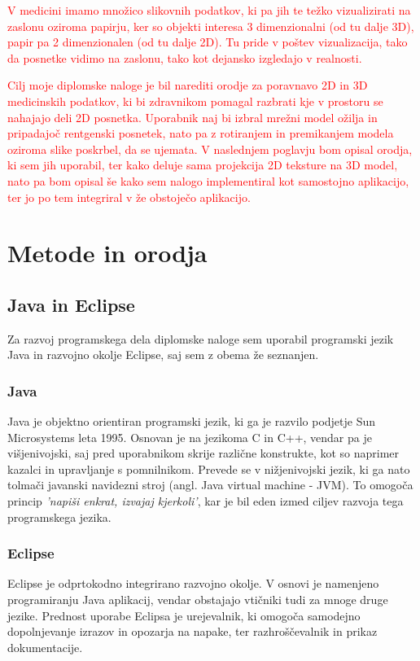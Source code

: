\documentclass[a4paper, 12pt]{book}
\begin{document}
\textcolor{red}{V medicini imamo množico slikovnih podatkov, ki pa jih te težko vizualizirati na zaslonu oziroma papirju, ker so objekti interesa 3 dimenzionalni (od tu dalje 3D), papir pa 2 dimenzionalen (od tu dalje 2D). Tu pride v poštev vizualizacija, tako da posnetke vidimo na zaslonu, tako kot dejansko izgledajo v realnosti.}

\textcolor{red}{Cilj moje diplomske naloge je bil narediti orodje za poravnavo 2D in 3D medicinskih podatkov, ki bi zdravnikom pomagal razbrati kje v prostoru se nahajajo deli 2D posnetka. Uporabnik naj bi izbral mrežni model ožilja in pripadajoč rentgenski posnetek, nato pa z rotiranjem in premikanjem modela oziroma slike poskrbel, da se ujemata. V naslednjem poglavju bom opisal orodja, ki sem jih uporabil, ter kako deluje sama projekcija 2D teksture na 3D model, nato pa bom opisal še kako sem nalogo implementiral kot samostojno aplikacijo, ter jo po tem integriral v že obstoječo aplikacijo.}

\chapter{Metode in orodja}
\section{Java in Eclipse}
Za razvoj programskega dela diplomske naloge sem uporabil programski jezik Java\cite{Java} in razvojno okolje Eclipse\cite{Eclipse}, saj sem z obema že seznanjen.
\subsection*{Java}
Java je objektno orientiran programski jezik, ki ga je razvilo podjetje Sun Microsystems leta 1995. Osnovan je na jezikoma C in C++, vendar pa je višjenivojski, saj pred uporabnikom skrije različne konstrukte, kot so naprimer kazalci in upravljanje s pomnilnikom. Prevede se v nižjenivojski jezik, ki ga nato tolmači javanski navidezni stroj (angl. Java virtual machine - JVM). To omogoča princip \emph{'napiši enkrat, izvajaj kjerkoli'}, kar je bil eden izmed ciljev razvoja tega programskega jezika.
\subsection*{Eclipse}
Eclipse je odprtokodno integrirano razvojno okolje. V osnovi je namenjeno programiranju Java aplikacij, vendar obstajajo vtičniki tudi za mnoge druge jezike. Prednost uporabe Eclipsa je urejevalnik, ki omogoča samodejno dopolnjevanje izrazov in opozarja na napake, ter razhroščevalnik in prikaz dokumentacije.
\end{document}
